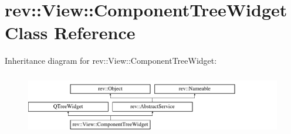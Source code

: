 \hypertarget{classrev_1_1_view_1_1_component_tree_widget}{}\section{rev\+::View\+::Component\+Tree\+Widget Class Reference}
\label{classrev_1_1_view_1_1_component_tree_widget}
Inheritance diagram for rev\+::View\+::Component\+Tree\+Widget\+:\begin{figure}[H]
\begin{center}
\leavevmode
\includegraphics[height=2.718446cm]{classrev_1_1_view_1_1_component_tree_widget}
\end{center}
\end{figure}
